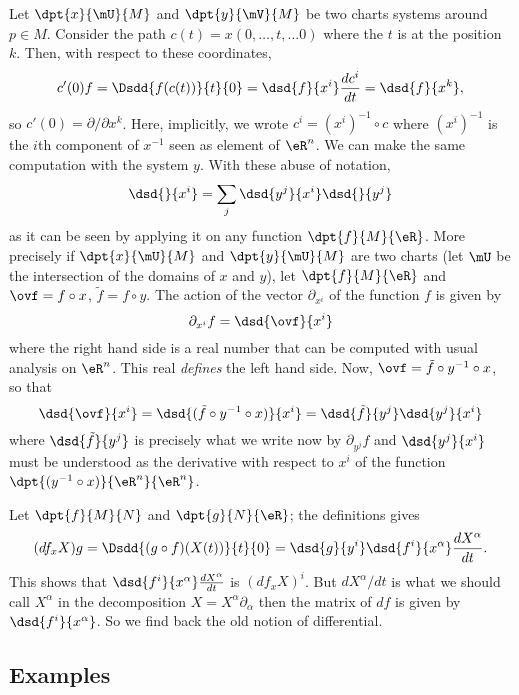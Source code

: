 Let $\dpt{x}{\mU}{M}$ and $\dpt{y}{\mV}{M}$ be two charts systems around $p\in M$. Consider the path $c(t)=x(0,\ldots,t,\ldots 0)$ where the $t$ is at the position $k$. Then, with respect to these coordinates,
\[
	c'(0)f=\Dsdd{ f(c(t))  }{t}{0}=\dsd{f}{x^i}\frac{dc^i}{dt}=\dsd{f}{x^k},
\]
so $c'(0)=\partial/\partial x^k$. Here, implicitly, we wrote $c^i=(x^i)^{-1}\circ c$ where $(x^i)^{-1}$ is the $i$th component of $x^{-1}$ seen as element of $\eR^n$. We can make the same computation with the system $y$. With these abuse of notation,
\begin{equation}
	\dsd{}{x^i}=\sum_j\dsd{y^j}{x^i}\dsd{}{y^j}
\end{equation}
as it can be seen by applying it on any function $\dpt{f}{M}{\eR}$. More precisely if $\dpt{x}{\mU}{M}$ and $\dpt{y}{\mU}{M}$ are two charts (let $\mU$ be the intersection of the domains of $x$ and $y$), let $\dpt{f}{M}{\eR}$ and $\ovf=f\circ x$, $\tilde f =f\circ y$. The action of the vector $\partial_{x^i}$ of the function $f$ is given by
\[
	\partial_{x^i}f=\dsd{\ovf}{x^i}
\]
where the right hand side is a real number that can be computed with usual analysis on $\eR^n$. This real \emph{defines} the left hand side. Now, $\ovf=\tilde f \circ y^{-1}\circ x$, so that
\[
	\dsd{\ovf}{x^i}=\dsd{ (\tilde f \circ y^{-1}\circ x) }{x^i}=\dsd{\tilde f }{y^j}\dsd{y^j}{x^i}
\]
where $\dsd{\tilde f }{y^j}$ is precisely what we write now by $\partial_{y^j}f$ and $\dsd{y^j}{x^i}$ must be understood as the derivative with respect to $x^i$ of the function $\dpt{(y^{-1}\circ x)}{\eR^n}{\eR^n}$.

Let $\dpt{f}{M}{N}$ and $\dpt{g}{N}{\eR}$; the definitions gives
\[
	(df_xX)g=\Dsdd{(g\circ f)(X(t))}{t}{0}
	=\dsd{g}{y^i}\dsd{f^i}{x^{\alpha}}\frac{dX^{\alpha}}{dt}.
\]
This shows that $\dsd{f^i}{x^{\alpha}}\frac{dX^{\alpha}}{dt}$ is $(df_xX)^i$.  But $dX^{\alpha}/dt$ is what we should call $X^{\alpha}$ in the decomposition $X=X^{\alpha}\partial_{\alpha}$ then the matrix of $df$ is given by $\dsd{f^i}{x^{\alpha}}$. So we find back the old notion of differential.

\subsection{Examples}

